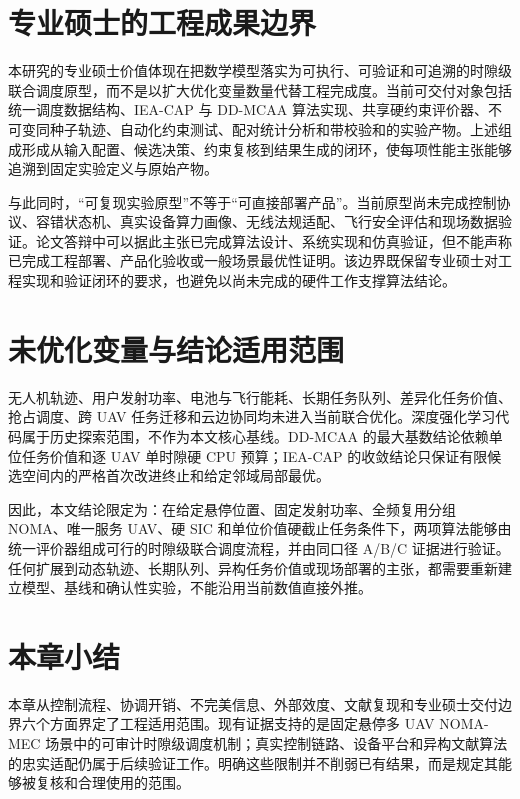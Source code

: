\section{专业硕士的工程成果边界}
本研究的专业硕士价值体现在把数学模型落实为可执行、可验证和可追溯的时隙级联合调度原型，而不是以扩大优化变量数量代替工程完成度。当前可交付对象包括统一调度数据结构、IEA-CAP 与 DD-MCAA 算法实现、共享硬约束评价器、不可变同种子轨迹、自动化约束测试、配对统计分析和带校验和的实验产物。上述组成形成从输入配置、候选决策、约束复核到结果生成的闭环，使每项性能主张能够追溯到固定实验定义与原始产物。

与此同时，“可复现实验原型”不等于“可直接部署产品”。当前原型尚未完成控制协议、容错状态机、真实设备算力画像、无线法规适配、飞行安全评估和现场数据验证。论文答辩中可以据此主张已完成算法设计、系统实现和仿真验证，但不能声称已完成工程部署、产品化验收或一般场景最优性证明。该边界既保留专业硕士对工程实现和验证闭环的要求，也避免以尚未完成的硬件工作支撑算法结论。

\section{未优化变量与结论适用范围}
无人机轨迹、用户发射功率、电池与飞行能耗、长期任务队列、差异化任务价值、抢占调度、跨 UAV 任务迁移和云边协同均未进入当前联合优化。深度强化学习代码属于历史探索范围，不作为本文核心基线。DD-MCAA 的最大基数结论依赖单位任务价值和逐 UAV 单时隙硬 CPU 预算；IEA-CAP 的收敛结论只保证有限候选空间内的严格首次改进终止和给定邻域局部最优。

因此，本文结论限定为：在给定悬停位置、固定发射功率、全频复用分组 NOMA、唯一服务 UAV、硬 SIC 和单位价值硬截止任务条件下，两项算法能够由统一评价器组成可行的时隙级联合调度流程，并由同口径 A/B/C 证据进行验证。任何扩展到动态轨迹、长期队列、异构任务价值或现场部署的主张，都需要重新建立模型、基线和确认性实验，不能沿用当前数值直接外推。

\section{本章小结}
本章从控制流程、协调开销、不完美信息、外部效度、文献复现和专业硕士交付边界六个方面界定了工程适用范围。现有证据支持的是固定悬停多 UAV NOMA-MEC 场景中的可审计时隙级调度机制；真实控制链路、设备平台和异构文献算法的忠实适配仍属于后续验证工作。明确这些限制并不削弱已有结果，而是规定其能够被复核和合理使用的范围。
